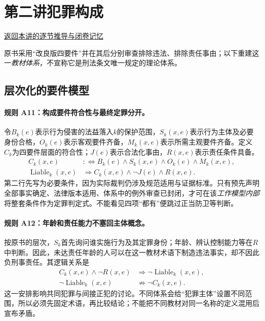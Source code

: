 \section{第二讲\quad 犯罪构成}

\label{ref:lecture:02}

\noindent\hyperref[lecture:02]{返回本讲的逐节推导与闭卷记忆}

原书采用“改良版四要件”并在其后分别审查排除违法、排除责任事由；以下重建这一\emph{教材体系}，不宣称它是刑法条文唯一规定的理论体系。

\subsection{层次化的要件模型}
\paragraph{规则 A11：构成要件符合性与最终定罪分开。}
令$B_k(e)$表示行为侵害的法益落入$k$的保护范围，$S_k(x,e)$表示行为主体及必要身份合格，$O_k(e)$表示客观要件齐备，$M_k(x,e)$表示所需主观要件齐备。定义$C_k$为四要件层面的符合性；$J(e)$表示合法化事由，$R(x,e)$表示责任条件具备。
\[
\begin{aligned}
C_k(x,e)&:\!\iff B_k(e)\land S_k(x,e)\land O_k(e)\land M_k(x,e),\\
\operatorname{Liable}_k(x,e)&\Longrightarrow
C_k(x,e)\land\neg J(e)\land R(x,e).
\end{aligned}
\]
第二行先写为必要条件，因为实际裁判仍涉及规范适用与证据标准。只有预先声明全部事实确定、法律版本适用、体系中的例外审查已封闭，才可在该\emph{工作模型内部}将整套条件作为定罪判定式。不能看见四项“都有”便跳过正当防卫等判断。

\paragraph{规则 A12：年龄和责任能力不塞回主体概念。}
按原书的层次，$S_k$首先询问谁实施行为及其定罪身份；年龄、辨认控制能力等在$R$中判断。因此，未达责任年龄的人可以在这一教材术语下制造违法事实，却不因此负刑事责任。其逻辑关系是
\[
\begin{aligned}
C_k(x,e)\land\neg R(x,e)
&\Longrightarrow\neg\operatorname{Liable}_k(x,e),\\
\neg\operatorname{Liable}_k(x,e)
&\nRightarrow\neg C_k(x,e).
\end{aligned}
\]
这一安排影响共同犯罪与间接正犯的讨论。不同体系会给“犯罪主体”设置不同范围，所以必须先固定术语，再比较结论；不能把不同教材对同一名称的定义混用后宣布矛盾。

